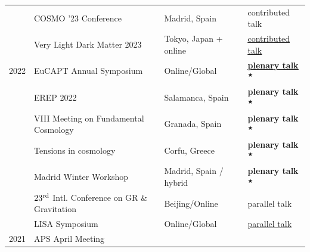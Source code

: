 \documentclass[11pt,a4paper]{article}
\begin{document}
\begin{longtable}{l p{} p{3.5cm} p{3cm}}
& COSMO '23 Conference & Madrid, Spain& contributed talk
\\
& Very Light Dark Matter 2023 & Tokyo, Japan + online & 
\href{https://youtu.be/acbsylgDwQc?t=11484}{\underline{contributed talk}}
\\
2022  
& EuCAPT Annual Symposium & Online/Global  & \textbf{%
\href{https://cds.cern.ch/record/2810852}{\underline{plenary talk}}$^\bigstar$} 
\\
& EREP 2022 & Salamanca, Spain  & \textbf{{plenary talk}$^\bigstar$}
\\
& VIII Meeting on Fundamental Cosmology & Granada, Spain  & \textbf{{plenary talk}$^\bigstar$} \\
& Tensions in cosmology & Corfu, Greece  & \textbf{{plenary talk}$^\bigstar$} \\
& Madrid Winter Workshop & Madrid, Spain / hybrid  & \textbf{{plenary talk}$^\bigstar$}%
\\ & $23^{\rm rd}$ Intl. Conference on GR \& Gravitation & Beijing/Online  & parallel talk
\\ & LISA Symposium & Online/Global  & \href{https://www.youtube.com/watch?v=XF_wsumMVKI}{\underline{parallel talk}}
\\
2021  
& APS April Meeting

\end{longtable}
\end{document}
